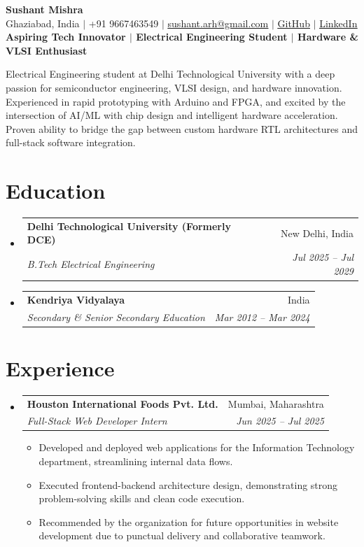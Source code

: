 \documentclass[letterpaper,10pt]{article}
\makeatletter
\newcommand{\resumeItem}[1]{
  \item\small{
    {#1 \vspace{-2pt}}
  }
}
\newcommand{\resumeSubheading}[4]{
  \vspace{-1pt}\item
    \begin{tabular*}{0.97\textwidth}[t]{l@{\extracolsep{\fill}}r}
      \textbf{#1} & #2 \\
      \textit{\small#3} & \textit{\small #4} \\
    \end{tabular*}\vspace{-5pt}
}
\makeatother
\begin{document}
\begin{center}
    {\Huge \textbf{Sushant Mishra}} \\ \vspace{5pt}
    Ghaziabad, India $|$ +91 9667463549 $|$ \href{mailto:sushant.arh@gmail.com}{\underline{sushant.arh@gmail.com}} $|$ 
    \href{https://github.com/BHUKKADDD}{\underline{GitHub}} $|$ \href{https://linkedin.com/in/}{\underline{LinkedIn}} \\ \vspace{5pt}
    \textbf{Aspiring Tech Innovator $|$ Electrical Engineering Student $|$ Hardware \& VLSI Enthusiast}
\end{center}
\vspace{-10pt}
\begin{center}
    \small{Electrical Engineering student at Delhi Technological University with a deep passion for semiconductor engineering, VLSI design, and hardware innovation. Experienced in rapid prototyping with Arduino and FPGA, and excited by the intersection of AI/ML with chip design and intelligent hardware acceleration. Proven ability to bridge the gap between custom hardware RTL architectures and full-stack software integration.}
\end{center}

\section{Education}
  \begin{itemize}[leftmargin=0.15in, label={}]
    \resumeSubheading
      {Delhi Technological University (Formerly DCE)}{New Delhi, India}
      {B.Tech Electrical Engineering}{Jul 2025 -- Jul 2029}
    \resumeSubheading
      {Kendriya Vidyalaya}{India}
      {Secondary \& Senior Secondary Education}{Mar 2012 -- Mar 2024}
  \end{itemize}

\section{Experience}
  \begin{itemize}[leftmargin=0.15in, label={}]
    \resumeSubheading
      {Houston International Foods Pvt. Ltd.}{Mumbai, Maharashtra}
      {Full-Stack Web Developer Intern}{Jun 2025 -- Jul 2025}
      \begin{itemize}[leftmargin=0.15in, label={\small$\bullet$}]
        \resumeItem{Developed and deployed web applications for the Information Technology department, streamlining internal data flows.}
        \resumeItem{Executed frontend-backend architecture design, demonstrating strong problem-solving skills and clean code execution.}
        \resumeItem{Recommended by the organization for future opportunities in website development due to punctual delivery and collaborative teamwork.}
      \end{itemize}
  \end{itemize}
\end{document}
